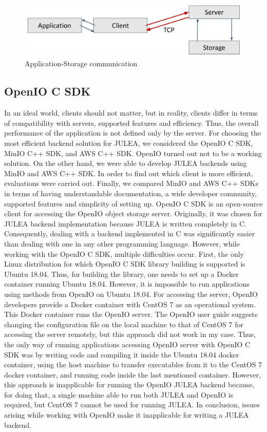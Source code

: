 \documentclass[conference]{IEEEtran}
\begin{document}
\begin{figure}
    \centering
    \includegraphics[width=0.85\linewidth]{keseniya-internship-presentation.pptx-4-page-001 (1).jpg}
    \caption{Application-Storage communication}
    \label{fig:app-storage-communication}
\end{figure}

\subsection{OpenIO C SDK}
In an ideal world, clients should not matter, but in reality, clients differ in terms of compatibility with servers, supported features and efficiency. Thus, the overall performance of the application is not defined only by the server. For choosing the most efficient backend solution for JULEA, we considered the OpenIO C SDK, MinIO C++ SDK, and AWS C++ SDK. OpenIO turned out not to be a working solution. On the other hand, we were able to develop JULEA backends using MinIO and AWS C++ SDK. In order to find out which client is more efficient, evaluations were carried out. Finally, we compared MinIO and AWS C++ SDKs in terms of having understandable documentation, a wide developer community, supported features and simplicity of setting up. 
OpenIO C SDK is an open-source client for accessing the OpenIO object storage server. Originally, it was chosen for JULEA backend implementation because JULEA is written completely in C. Consequently, dealing with a backend implemented in C was significantly easier than dealing with one in any other programming language. However, while working with the OpenIO C SDK, multiple difficulties occur. First, the only Linux distribution for which OpenIO C SDK library building is supported is Ubuntu 18.04. Thus, for building the library, one needs to set up a Docker container running Ubuntu 18.04. However, it is impossible to run applications using methods from OpenIO on Ubuntu 18.04. For accessing the server, OpenIO developers provide a Docker container with CentOS 7 as an operational system. This Docker container runs the OpenIO server. The OpenIO user guide suggests changing the configuration file on the local machine to that of CentOS 7 for accessing the server remotely, but this approach did not work in my case. Thus, the only way of running applications accessing OpenIO server with OpenIO C SDK was by writing code and compiling it inside the Ubuntu 18.04 docker container, using the host machine to transfer executables from it to the CentOS 7 docker container, and running code inside the last mentioned container. However, this approach is inapplicable for running the OpenIO JULEA backend because, for doing that, a single machine able to run both JULEA and OpenIO is required, but CentOS 7 cannot be used for running JULEA. In conclusion, issues arising while working with OpenIO make it inapplicable for writing a JULEA backend.
\end{document}

